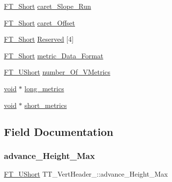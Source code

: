\begin{DoxyCompactItemize}
\item 
\hyperlink{fttypes_8h_aa7279be89046a2563cd3d4d6651fbdcf}{F\+T\+\_\+\+Short} \hyperlink{struct_t_t___vert_header___a98ff91b532d827440f7140d3071d473d}{caret\+\_\+\+Slope\+\_\+\+Run}
\item 
\hyperlink{fttypes_8h_aa7279be89046a2563cd3d4d6651fbdcf}{F\+T\+\_\+\+Short} \hyperlink{struct_t_t___vert_header___a89ff9369f61dc5b770cde0eda954d402}{caret\+\_\+\+Offset}
\item 
\hyperlink{fttypes_8h_aa7279be89046a2563cd3d4d6651fbdcf}{F\+T\+\_\+\+Short} \hyperlink{struct_t_t___vert_header___a54930b56bb8be0a8eb22753a9242fc5f}{Reserved} \mbox{[}4\mbox{]}
\item 
\hyperlink{fttypes_8h_aa7279be89046a2563cd3d4d6651fbdcf}{F\+T\+\_\+\+Short} \hyperlink{struct_t_t___vert_header___aa7c3983f62f7bf736eaaaae684b65dd7}{metric\+\_\+\+Data\+\_\+\+Format}
\item 
\hyperlink{fttypes_8h_a937f6c17cf5ffd09086d8610c37b9f58}{F\+T\+\_\+\+U\+Short} \hyperlink{struct_t_t___vert_header___a4ca6fe9cdd12fbc9a1129c4fbf6bddd1}{number\+\_\+\+Of\+\_\+\+V\+Metrics}
\item 
\hyperlink{png_8h_ac9c84fa68bbad002983e35ce3663c686}{void} $\ast$ \hyperlink{struct_t_t___vert_header___ac789245d0d6243bc965ad43702bdc671}{long\+\_\+metrics}
\item 
\hyperlink{png_8h_ac9c84fa68bbad002983e35ce3663c686}{void} $\ast$ \hyperlink{struct_t_t___vert_header___ad5e875c19a02b0f6777db1c122bff2f3}{short\+\_\+metrics}
\end{DoxyCompactItemize}


\subsection{Field Documentation}
\mbox{\label{struct_t_t___vert_header___a7a2acbd1abd4cc4d6f40110203f99d0f}} 
\subsubsection{\texorpdfstring{advance\+\_\+\+Height\+\_\+\+Max}{advance\_Height\_Max}}
{\footnotesize\ttfamily \hyperlink{fttypes_8h_a937f6c17cf5ffd09086d8610c37b9f58}{F\+T\+\_\+\+U\+Short} T\+T\+\_\+\+Vert\+Header\+\_\+\+::advance\+\_\+\+Height\+\_\+\+Max}

